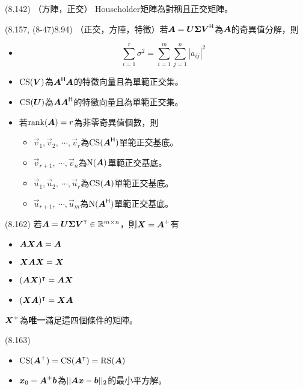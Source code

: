 \item \begin{theorem}{(8.142)} （方陣，正交） Householder矩陣為對稱且正交矩陣。
\end{theorem}

\item \begin{theorem}{(8.157, (8-47)8.94)} （正交，方陣，特徵）若$\boldsymbol{A} = \boldsymbol{U\Sigma V}^{\mathsf{H}}$為$\boldsymbol{A}$的奇異值分解，則
	\begin{itemize}
		\item \begin{equation}
			\sum_{i = 1}^{r} \sigma^2 = \sum_{i = 1}^{m}\sum_{j = 1}^{n}|a_{ij}|^{2}
		\end{equation}
		\item $\operatorname{CS}(\boldsymbol{V})$為$\boldsymbol{A}^{\mathsf{H}}\boldsymbol{A}$的特徵向量且為單範正交集。
		\item $\operatorname{CS}(\boldsymbol{U})$為$\boldsymbol{A}\boldsymbol{A}^{\mathsf{H}}$的特徵向量且為單範正交集。
		\item 若$\operatorname{rank}(\boldsymbol{A}) = r$為非零奇異值個數，則 \begin{itemize}
			\item $\vec{v}_1, \vec{v}_2, \ \cdots, \vec{v}_r$為$\operatorname{CS}(\boldsymbol{A}^{\mathsf{H}})$單範正交基底。
			\item $\vec{v}_{r + 1}, \ \cdots, \vec{v}_n$為$\operatorname{N}(\boldsymbol{A})$單範正交基底。
			\item $\vec{u}_1, \vec{u}_2, \ \cdots, \vec{u}_r$為$\operatorname{CS}(\boldsymbol{A})$單範正交基底。
			\item $\vec{u}_{r + 1}, \ \cdots, \vec{u}_m$為$\operatorname{N}(\boldsymbol{A}^{\mathsf{H}})$單範正交基底。 
		\end{itemize}
	\end{itemize}
\end{theorem}

\item \begin{theorem}{(8.162)} 若$\boldsymbol{A} = \boldsymbol{U\Sigma V}^\intercal \in \mathbb{R}^{m \times n}$，則$\boldsymbol{X} = \boldsymbol{A}^+$有 \begin{itemize}
		\item $\boldsymbol{AXA} = \boldsymbol{A}$
		\item $\boldsymbol{XAX} = \boldsymbol{X}$
		\item $(\boldsymbol{AX})^\intercal = \boldsymbol{AX}$
		\item $(\boldsymbol{XA})^\intercal = \boldsymbol{XA}$
	\end{itemize} $\boldsymbol{X}^+$為\textbf{唯一}滿足這四個條件的矩陣。
\end{theorem}

\item \begin{theorem}{(8.163)} \quad\quad \begin{itemize}
		\item $\operatorname{CS}(\boldsymbol{A}^+) = \operatorname{CS}(\boldsymbol{A}^\intercal) = \operatorname{RS}(\boldsymbol{A})$
		\item $\boldsymbol{x}_0 = \boldsymbol{A}^+ \boldsymbol{b}$為$||\boldsymbol{A}\boldsymbol{x} - \boldsymbol{b}||_2$的最小平方解。
	\end{itemize}
\end{theorem}
